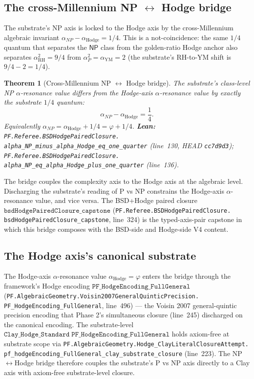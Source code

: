 \documentclass[11pt,a4paper]{article}
\theoremstyle{plain}
\newtheorem{theorem}{Theorem}[section]
\theoremstyle{definition}
\begin{document}
\subsection{The cross-Millennium NP $\leftrightarrow$ Hodge bridge}
\label{sec:np-hodge-bridge}

The substrate's NP axis is locked to the Hodge axis by the
cross-Millennium algebraic invariant
$\alpha_{NP} - \alpha_{\mathrm{Hodge}} = 1/4$. This is a
not-coincidence: the same $1/4$ quantum that separates the
$\mathsf{NP}$ class from the golden-ratio Hodge anchor also separates
$\alpha_{\mathrm{RH}}^{2} = 9/4$ from
$\alpha_{P}^{2} = \alpha_{\mathrm{YM}} = 2$ (the substrate's RH-to-YM
shift is $9/4 - 2 = 1/4$).

\begin{theorem}[Cross-Millennium NP $\leftrightarrow$ Hodge bridge]
\label{thm:np-hodge}
The substrate's class-level NP $\alpha$-resonance value differs from
the Hodge-axis $\alpha$-resonance value by exactly the substrate
$1/4$ quantum:
\[
\alpha_{NP} - \alpha_{\mathrm{Hodge}} = \frac{1}{4}.
\]
Equivalently $\alpha_{NP} = \alpha_{\mathrm{Hodge}} + 1/4 = \varphi +
1/4$.
\textbf{Lean:}
\texttt{PF.Referee.BSDHodgePairedClosure.\\
alpha\_NP\_minus\_alpha\_Hodge\_eq\_one\_quarter}
(line~130, HEAD \texttt{cc7d9d3});
\texttt{PF.Referee.BSDHodgePairedClosure.\\
alpha\_NP\_eq\_alpha\_Hodge\_plus\_one\_quarter}
(line~136).
\end{theorem}

The bridge couples the complexity axis to the Hodge axis at the
algebraic level. Discharging the substrate's reading of P vs NP
constrains the Hodge-axis $\alpha$-resonance value, and vice versa.
The BSD+Hodge paired closure $\mathtt{bsdHodgePairedClosure\_capstone}$
(\texttt{PF.Referee.BSDHodgePairedClosure.\\
bsdHodgePairedClosure\_capstone}, line~324) is the typed-axis-pair
capstone in which this bridge composes with the BSD-side and
Hodge-side V4 content.

\subsection{The Hodge axis's canonical substrate}
\label{sec:hodge-substrate}

The Hodge-axis $\alpha$-resonance value $\alpha_{\mathrm{Hodge}} =
\varphi$ enters the bridge through the framework's Hodge encoding
$\mathtt{PF\_HodgeEncoding\_FullGeneral}$
(\texttt{PF.AlgebraicGeometry.Voisin2007GeneralQuinticPrecision.\\
PF\_HodgeEncoding\_FullGeneral}, line~496) --- the Voisin 2007
general-quintic precision encoding that Phase 2's simultaneous
closure (line~245) discharged on the canonical encoding. The
substrate-level $\mathtt{Clay\_Hodge\_Standard\;
PF\_HodgeEncoding\_FullGeneral}$ holds axiom-free at substrate scope
via
\texttt{PF.AlgebraicGeometry.Hodge\_ClayLiteralClosureAttempt.\\
pf\_hodgeEncoding\_FullGeneral\_clay\_substrate\_closure}
(line~223). The NP$\leftrightarrow$Hodge bridge therefore couples the
substrate's P vs NP axis directly to a Clay axis with axiom-free
substrate-level closure.
\end{document}
